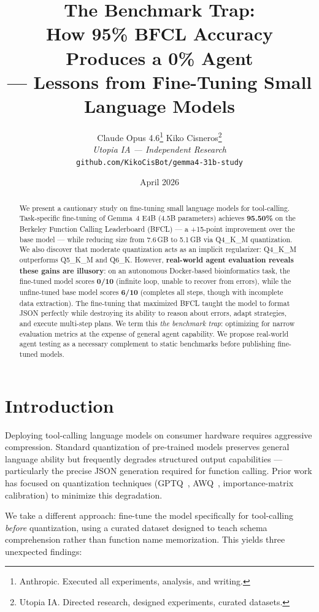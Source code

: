\documentclass[11pt,a4paper]{article}
\title{\textbf{The Benchmark Trap:\\How 95\% BFCL Accuracy Produces a 0\% Agent\\--- Lessons from Fine-Tuning Small Language Models}}
\author{
Claude Opus 4.6\thanks{Anthropic. Executed all experiments, analysis, and writing.} \quad
Kiko Cisneros\thanks{Utopia IA. Directed research, designed experiments, curated datasets.}\\[6pt]
\textit{Utopia IA --- Independent Research}\\
\texttt{github.com/KikoCisBot/gemma4-31b-study}
}
\date{April 2026}
\begin{document}
\maketitle

\begin{abstract}
We present a cautionary study on fine-tuning small language models for tool-calling. Task-specific fine-tuning of Gemma~4 E4B (4.5B parameters) achieves \textbf{95.50\%} on the Berkeley Function Calling Leaderboard (BFCL) --- a +15-point improvement over the base model --- while reducing size from 7.6\,GB to 5.1\,GB via Q4\_K\_M quantization. We also discover that moderate quantization acts as an implicit regularizer: Q4\_K\_M outperforms Q5\_K\_M and Q6\_K. However, \textbf{real-world agent evaluation reveals these gains are illusory}: on an autonomous Docker-based bioinformatics task, the fine-tuned model scores \textbf{0/10} (infinite loop, unable to recover from errors), while the unfine-tuned base model scores \textbf{6/10} (completes all steps, though with incomplete data extraction). The fine-tuning that maximized BFCL taught the model to format JSON perfectly while destroying its ability to reason about errors, adapt strategies, and execute multi-step plans. We term this \emph{the benchmark trap}: optimizing for narrow evaluation metrics at the expense of general agent capability. We propose real-world agent testing as a necessary complement to static benchmarks before publishing fine-tuned models.
\end{abstract}

\section{Introduction}

Deploying tool-calling language models on consumer hardware requires aggressive compression. Standard quantization of pre-trained models preserves general language ability but frequently degrades structured output capabilities --- particularly the precise JSON generation required for function calling. Prior work has focused on quantization techniques (GPTQ~\citep{frantar2023gptq}, AWQ~\citep{lin2024awq}, importance-matrix calibration) to minimize this degradation.

We take a different approach: fine-tune the model specifically for tool-calling \emph{before} quantization, using a curated dataset designed to teach schema comprehension rather than function name memorization. This yields three unexpected findings:
\end{document}
